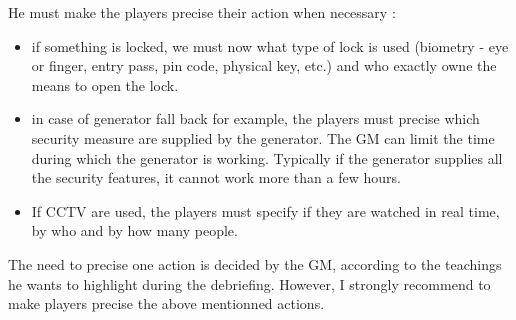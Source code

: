 \documentclass[11pt]{article} %
\begin{document}
He must make the players precise their action when necessary :
\begin{itemize}
\item if something is locked, we must now what type of lock is used (biometry -  eye or finger, 
entry pass, pin code, physical key, etc.) and who exactly owne the means to open the lock.
\item in case of generator fall back for example, the players must precise which security 
measure are supplied by the generator. The GM can limit the time during which the generator
is working. Typically if the generator supplies all the security features, it cannot work more than 
a few hours.
\item If CCTV are used, the players must specify if they are watched in real time, 
by who and by how many people. 
\end{itemize}
%

The need to precise one action is decided by the GM, according to the teachings 
he wants to highlight during the debriefing. However, I strongly recommend to 
make players precise the above mentionned actions.
\end{document}

